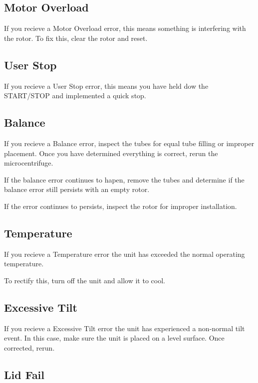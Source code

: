 \documentclass[12pt]{../SOP3_beta}\usepackage[]{graphicx}\usepackage[]{color}
\begin{document}
\subsection*{Motor Overload}

\NP If you recieve a Motor Overload error, this means something is interfering with the rotor. To fix this, clear the rotor and reset. 

\subsection*{User Stop}

\NP If you recieve a User Stop error, this means you have held dow the START/STOP and implemented a quick stop.

\subsection*{Balance}

\NP If you recieve a Balance error, inspect the tubes for equal tube filling or improper placement. Once you have determined everything is correct, rerun the microcentrifuge. 

\NP If the balance error continues to hapen, remove the tubes and determine if the balance error still persists with an empty rotor.

\NP If the error continues to persists, inspect the rotor for improper installation. 

\subsection*{Temperature}

\NP If you recieve a Temperature error the unit has exceeded the normal operating temperature. 

\NP To rectify this, turn off the unit and allow it to cool. 

\subsection*{Excessive Tilt}

\NP If you recieve a Excessive Tilt error the unit has experienced a non-normal tilt event. In this case, make sure the unit is placed on a level surface. Once corrected, rerun. 

\subsection*{Lid Fail}
\end{document}
